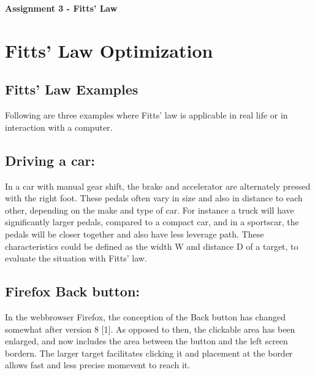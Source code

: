 \documentclass[a4paper,twoside,10pt]{article}
\begin{document}
\pagestyle{fancyplain}


\renewcommand{\headrulewidth}{0px}

\begin{center}
\huge{\textbf{Assignment 3 - Fitts' Law}}
\end{center}
\vspace{.5cm}

\section{Fitts' Law Optimization} 
\subsection{Fitts' Law Examples} 
Following are three examples where Fitts' law is applicable in real life or in interaction with a computer.
\subsection*{Driving a car:} In a car with manual gear shift, the brake and accelerator are alternately pressed with the right foot. These pedals often vary in size and also in distance to each other, depending on the make and type of car. For instance a truck will have significantly larger pedals, compared to a compact car, and in a sportscar, the pedals will be closer together and also have less leverage path. These characteristics could be defined as the width W and distance D of a target, to evaluate the situation with Fitts' law.
\subsection*{Firefox Back button:} In the webbrowser Firefox, the conception of the Back button has changed somewhat after version 8 [1]. As opposed to then, the clickable area has been enlarged, and now includes the area between the button and the left screen bordern. The larger target facilitates clicking it and placement at the border allows fast and less precise momevent to reach it.
\end{document}
